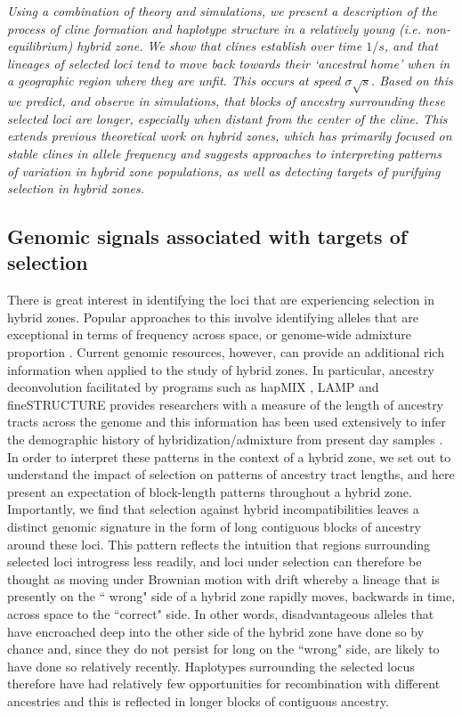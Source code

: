 \documentclass[11pt,letterpaper]{article}
\newcommand{\alisa}[1]{{\em \color{red} #1}}
\begin{document}
\alisa{Using a combination of theory and simulations, we present a description of the process of cline formation and haplotype structure in a relatively young (i.e. non-equilibrium) hybrid zone.
We show that clines establish over time $1/s$, and that lineages of selected loci tend to move back towards their `ancestral home' when in a geographic region where they  are unfit. 
This occurs at speed $\sigma\sqrt{s}$. Based on this we predict, and observe in simulations, that blocks of ancestry surrounding these selected loci are longer, especially when distant from the center of the cline. 
This extends previous theoretical work on hybrid zones, which has primarily focused on stable clines in allele frequency and  suggests approaches to interpreting patterns of variation in hybrid zone populations, as well as detecting targets of purifying selection in hybrid zones.}

\subsection*{Genomic signals associated with targets of selection}

There is great interest in identifying the loci that are experiencing selection in hybrid zones. Popular approaches to this involve identifying alleles that are exceptional in terms of frequency across space, or genome-wide admixture proportion \citep{Porter1997,Gompert2012}.  
Current genomic resources, however, can provide an additional rich information when applied to the study of hybrid zones.
In particular, ancestry deconvolution facilitated by programs such as  hapMIX \citep{Price2009}, LAMP \citep{Sankararaman2008} and fineSTRUCTURE \citep{Lawson2012} provides researchers with a measure of the length of ancestry tracts across the genome and this information has been used extensively to infer the demographic history of hybridization/admixture from present day samples \citep[e.g. ][]{Hellenthal2014}. 
In order to interpret these patterns in the context of a hybrid zone, we set out to understand the impact of selection on patterns of ancestry tract lengths, and here present an expectation of block-length patterns throughout a hybrid zone. 
Importantly, we find that selection against hybrid incompatibilities leaves a distinct genomic signature in the form of long contiguous blocks of ancestry around these loci.
This pattern reflects the intuition that regions surrounding selected loci introgress less readily, and loci under selection can therefore be thought as moving under Brownian motion with drift whereby a lineage that is presently on the `` wrong" side of a hybrid zone rapidly moves, backwards in time, across space to the ``correct" side. 
In other words, disadvantageous alleles that have encroached deep into the other side of the hybrid zone have done so by chance and, since they do not persist for long on the ``wrong" side, are likely to have done so relatively recently. Haplotypes surrounding the selected locus therefore have had relatively few opportunities for recombination with different ancestries and this is reflected in longer blocks of contiguous ancestry.
\end{document}
